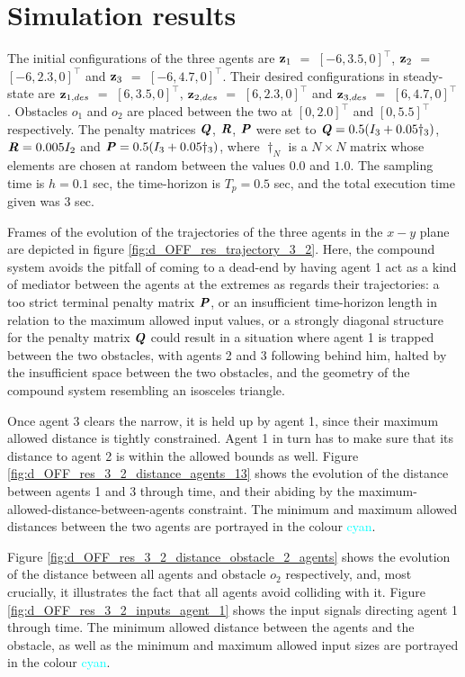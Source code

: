 \section{Simulation results}

The initial configurations of the three agents are
$\bm{\mathbf{z}}_1$ $=$ $[-6, 3.5, 0]^{\top}$,
$\bm{\mathbf{z}}_2$ $=$ $[-6, 2.3, 0]^{\top}$ and
$\bm{\mathbf{z}}_3$ $=$ $[-6, 4.7, 0]^{\top}$.
Their desired configurations in steady-state are
$\bm{\mathbf{z}}_{1,des}$ $=$ $[6, 3.5, 0]^{\top}$,
$\bm{\mathbf{z}}_{2,des}$ $=$ $[6, 2.3, 0]^{\top}$ and
$\bm{\mathbf{z}}_{3,des}$ $=$ $[6, 4.7, 0]^{\top}$.
Obstacles $o_1$ and $o_2$ are placed between the two at $[0, 2.0]^{\top}$
and $[0, 5.5]^{\top}$ respectively. The penalty
matrices $\bm{\mathit{Q}}$, $\bm{\mathit{R}}$, $\bm{\mathit{P}}$ were set to
$\bm{\mathit{Q}} = 0.5 (I_3 + 0.05\dagger_3)$, $\bm{\mathit{R}} = 0.005 I_2$ and
$\bm{\mathit{P}} = 0.5 (I_3 + 0.05\dagger_3)$, where $\dagger_N$ is a $N \times N$
matrix whose elements are chosen at random between the values $0.0$ and $1.0$.
The sampling time is $h = 0.1$ sec, the time-horizon is $T_p = 0.5$ sec, and
the total execution time given was $3$ sec.

Frames of the evolution of the trajectories of the three agents in the $x-y$
plane are depicted in figure \eqref{fig:d_OFF_res_trajectory_3_2}. Here, the
compound system avoids the pitfall of coming to a dead-end by having agent 1
act as a kind of mediator between the agents at the extremes as regards their
trajectories: a too strict terminal penalty matrix $\bm{\mathit{P}}$, or an insufficient
time-horizon length in relation to the maximum allowed input values, or a
strongly diagonal structure for the penalty matrix $\bm{\mathit{Q}}$ could result in
a situation where agent 1 is trapped between the two obstacles, with agents 2
and 3 following behind him, halted by the insufficient space between the two
obstacles, and the geometry of the compound system resembling an isosceles
triangle.

Once agent 3 clears the narrow, it is held up by agent 1, since their
maximum allowed distance is tightly constrained. Agent 1 in turn has to make
sure that its distance to agent 2 is within the allowed bounds as well. Figure
\eqref{fig:d_OFF_res_3_2_distance_agents_13} shows the evolution of the
distance between agents 1 and 3 through time, and their abiding by the
maximum-allowed-distance-between-agents constraint. The minimum and maximum
allowed distances between the two agents are portrayed in the
colour \textcolor{cyan}{cyan}.

Figure \eqref{fig:d_OFF_res_3_2_distance_obstacle_2_agents} shows the
evolution of the distance between all agents and obstacle $o_2$ respectively,
and, most crucially, it illustrates the fact that all agents avoid colliding
with it. Figure \eqref{fig:d_OFF_res_3_2_inputs_agent_1} shows the input signals
directing agent 1 through time. The minimum allowed distance between the agents
and the obstacle, as well as the minimum and maximum allowed input sizes are
portrayed in the colour \textcolor{cyan}{cyan}.

